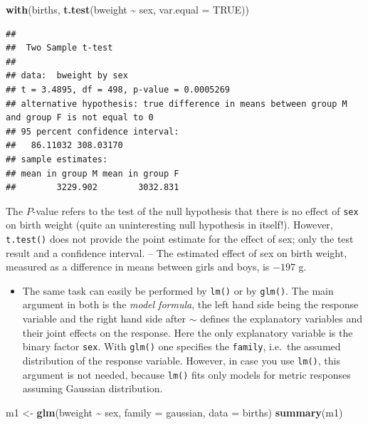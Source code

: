 \documentclass[
]{book}
\newenvironment{Shaded}{\begin{snugshade}}{\end{snugshade}}
\newcommand{\AttributeTok}[1]{\textcolor[rgb]{0.13,0.29,0.53}{#1}}
\newcommand{\ConstantTok}[1]{\textcolor[rgb]{0.56,0.35,0.01}{#1}}
\newcommand{\FunctionTok}[1]{\textcolor[rgb]{0.13,0.29,0.53}{\textbf{#1}}}
\newcommand{\NormalTok}[1]{#1}
\newcommand{\OtherTok}[1]{\textcolor[rgb]{0.56,0.35,0.01}{#1}}
\newcommand{\SpecialCharTok}[1]{\textcolor[rgb]{0.81,0.36,0.00}{\textbf{#1}}}
\providecommand{\tightlist}{%
  \setlength{\itemsep}{0pt}\setlength{\parskip}{0pt}}
\begin{document}
\begin{Shaded}
\begin{Highlighting}[]
\FunctionTok{with}\NormalTok{(births, }\FunctionTok{t.test}\NormalTok{(bweight }\SpecialCharTok{\textasciitilde{}}\NormalTok{ sex, }\AttributeTok{var.equal =} \ConstantTok{TRUE}\NormalTok{))}
\end{Highlighting}
\end{Shaded}

\begin{verbatim}
## 
##  Two Sample t-test
## 
## data:  bweight by sex
## t = 3.4895, df = 498, p-value = 0.0005269
## alternative hypothesis: true difference in means between group M and group F is not equal to 0
## 95 percent confidence interval:
##   86.11032 308.03170
## sample estimates:
## mean in group M mean in group F 
##        3229.902        3032.831
\end{verbatim}

The \(P\)-value refers to the test
of the null hypothesis that there is no effect of \texttt{sex} on birth weight
(quite an uninteresting null hypothesis in itself!). However, \texttt{t.test()} does not provide
the point estimate for the effect of sex; only the test result and a confidence interval. -- The estimated effect of sex on birth weight,
measured as a difference in means between girls and boys,
is \(-197\) g.

\begin{itemize}
\tightlist
\item
  The same task can easily be performed by \texttt{lm()} or by \texttt{glm()}.
  The main argument in both
  is the \emph{model formula}, the left hand side being the response variable
  and the right hand side
  after \(\sim\) defines the explanatory variables and their
  joint effects on the response. Here the only
  explanatory variable is the binary factor \texttt{sex}. With \texttt{glm()} one specifies the
  \texttt{family}, i.e.~the assumed distribution of the response variable. However,
  in case you use
  \texttt{lm()}, this argument is not needed, because \texttt{lm()} fits only
  models for metric responses assuming Gaussian distribution.
\end{itemize}

\begin{Shaded}
\begin{Highlighting}[]
\NormalTok{m1 }\OtherTok{\textless{}{-}} \FunctionTok{glm}\NormalTok{(bweight }\SpecialCharTok{\textasciitilde{}}\NormalTok{ sex, }\AttributeTok{family =}\NormalTok{ gaussian, }\AttributeTok{data =}\NormalTok{ births)}
\FunctionTok{summary}\NormalTok{(m1)}
\end{Highlighting}
\end{Shaded}
\end{document}
